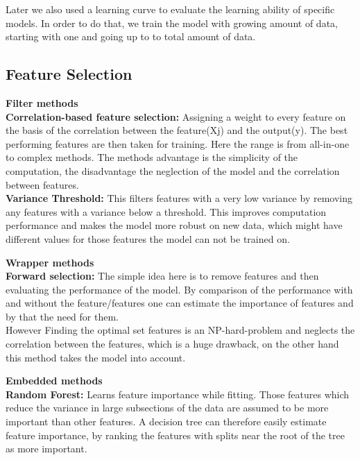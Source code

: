 \documentclass[a4paper,12pt]{article}
\newcommand{\initials}[1]{\marginpar{\quad\texttt{#1}}}
\begin{document}
 Later we also used a learning curve to evaluate the learning ability of specific models. In order to do that, we train the model with growing amount of data, starting with one and going up to to total amount of data.
 
\subsection{Feature Selection}
\initials{MF}

\begin{description}
\item \textbf{Filter methods}\\
\textbf{Correlation-based feature selection:} Assigning a weight to every feature on the basis of the correlation between the feature(Xj) and the output(y). The best performing features are then taken for training. Here the range is from all-in-one to complex methods. The methods advantage is the simplicity of the computation, the disadvantage the neglection of the model and the correlation between features.\\
\textbf{Variance Threshold:} This filters features with a very low variance by removing any features with a variance below a threshold. This improves computation performance and makes the model more robust on new data, which might have different values for those features the model can not be trained on.\\
\item \textbf{Wrapper methods}\\
\textbf{Forward selection:} The simple idea here is to remove features and then evaluating the performance of the model. By comparison of the performance with and without the feature/features one can estimate the importance of features and by that the need for them.\\
However Finding the optimal set features is an NP-hard-problem and neglects the correlation between the features, which is a huge drawback, on the other hand this method takes the model into account.\\
\item \textbf{Embedded methods}\\
\textbf{Random Forest:} Learns feature importance while fitting. Those features which reduce the variance in large subsections of the data are assumed to be more important than other features. A decision tree can therefore easily estimate feature importance, by ranking the features with splits near the root of the tree as more important.
\end{description}
\end{document}
